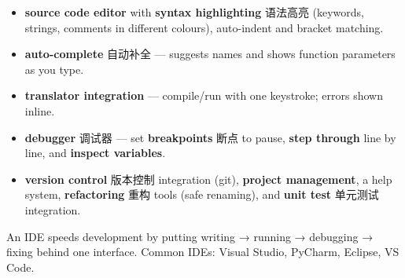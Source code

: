 \documentclass[11pt]{article}
\begin{document}
\begin{itemize}
\item \textbf{source code editor} with \textbf{syntax highlighting} 语法高亮 (keywords, strings, comments in different colours), auto-indent and bracket matching.

\item \textbf{auto-complete} 自动补全 — suggests names and shows function parameters as you type.

\item \textbf{translator integration} — compile/run with one keystroke; errors shown inline.

\item \textbf{debugger} 调试器 — set \textbf{breakpoints} 断点 to pause, \textbf{step through} line by line, and \textbf{inspect variables}.

\item \textbf{version control} 版本控制 integration (git), \textbf{project management}, a help system, \textbf{refactoring} 重构 tools (safe renaming), and \textbf{unit test} 单元测试 integration.

\end{itemize}

An IDE speeds development by putting writing → running → debugging → fixing behind one interface. Common IDEs: Visual Studio, PyCharm, Eclipse, VS Code.
\end{document}
